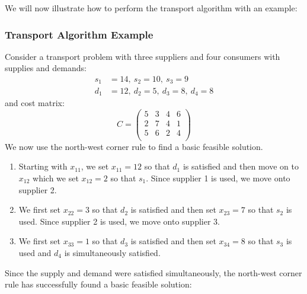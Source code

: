 \documentclass[../main.tex]{subfiles}
\begin{document}
We will now illustrate how to perform the transport algorithm with an example:
\subsubsection{Transport Algorithm Example}
Consider a transport problem with three suppliers and four consumers with supplies and demands:
\begin{align*}
  s_1 &= 14,\ s_2 = 10,\ s_3 = 9 \\
  d_1 &= 12,\ d_2 = 5,\ d_3 = 8,\ d_4 = 8
\end{align*}
and cost matrix:
\[
  C = \begin{pmatrix}
  5 & 3 & 4 & 6 \\
  2 & 7 & 4 & 1 \\
  5 & 6 & 2 & 4 \\
  \end{pmatrix}
\]
We now use the north-west corner rule to find a basic feasible solution.
\begin{enumerate}
  \item Starting with $x_{1 1}$, we set $x_{1 1} = 12$ so that $d_1$ is satisfied and then move on to $x_{1 2}$ which we set $x_{1 2} = 2$ so that $s_1$.
    Since supplier 1 is used, we move onto supplier 2.
  \item We first set $x_{2 2} = 3$ so that $d_2$ is satisfied and then set $x_{2 3} = 7$ so that $s_2$ is used.
    Since supplier 2 is used, we move onto supplier 3.
  \item We first set $x_{3 3} = 1$ so that $d_3$ is satisfied and then set $x_{3 4} = 8$ so that $s_3$ is used and $d_4$ is simultaneously satisfied.
\end{enumerate}
Since the supply and demand were satisfied simultaneously, the north-west corner rule has successfully found a basic feasible solution:
\end{document}
